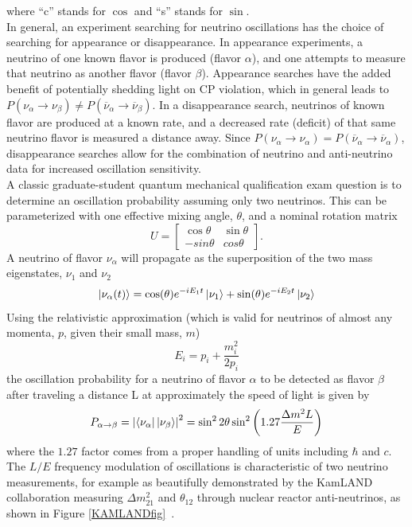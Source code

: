 where ``c'' stands for $\cos$ and ``s'' stands for $\sin$.\\

In general, an experiment searching for neutrino oscillations has the choice of searching for appearance or disappearance. In appearance experiments, a neutrino of one known flavor is produced (flavor $\alpha$), and one attempts to measure that neutrino as another flavor (flavor $\beta$). Appearance searches have the added benefit of potentially shedding light on CP violation, which in general leads to $P(\nu_\alpha\rightarrow\nu_\beta) \ne P(\overline{\nu}_\alpha\rightarrow\overline{\nu}_\beta)$. In a disappearance search, neutrinos of known flavor are produced at a known rate, and a decreased rate (deficit) of that same neutrino flavor is measured a distance away. Since $P(\nu_\alpha\rightarrow\nu_\alpha) = P(\overline{\nu}_\alpha\rightarrow\overline{\nu}_\alpha)$, disappearance searches allow for the combination of neutrino and anti-neutrino data for increased oscillation sensitivity.\\

A classic graduate-student quantum mechanical qualification exam question is to determine an oscillation probability assuming only two neutrinos. This can be parameterized with one effective mixing angle, $\theta$, and a nominal rotation matrix
\begin{equation}\label{rotmatrix}
U = \begin{bmatrix} \cos\theta & \sin\theta \\ -sin\theta & cos\theta \end{bmatrix}.
\end{equation}
A neutrino of flavor $\nu_\alpha$ will propagate as the superposition of the two mass eigenstates, $\nu_1$ and $\nu_2$
\begin{equation}\label{twonupropagation}
\Ket{\nu_\alpha (t)} = \cos(\theta)e^{-iE_1t}\ket{\nu_1} + \sin(\theta)e^{-iE_2t}\ket{\nu_2} 
\end{equation}
Using the relativistic approximation (which is valid for neutrinos of almost any momenta, $p$, given their small mass, $m$)
\begin{equation}\label{relapprox}
E_i = p_i + \frac{m_i^2}{2p_i}
\end{equation}
the oscillation probability for a neutrino of flavor $\alpha$ to be detected as flavor $\beta$ after traveling a distance L at approximately the speed of light is given by
\begin{equation}\label{twoneutrinooscprob0}
P_{\alpha \rightarrow \beta} = \left|\Bra{\nu_\alpha}\Ket{\nu_\beta}\right|^2 = \sin^2 2\theta \sin^2 \left( 1.27 \frac{\Delta m^2 L}{E} \right)
\end{equation}
where the $1.27$ factor comes from a proper handling of units including $\hbar$ and $c$. The $L/E$ frequency modulation of oscillations is characteristic of two neutrino measurements, for example as beautifully demonstrated by the KamLAND collaboration measuring $\Delta m_{21}^2$ and $\theta_{12}$ through nuclear reactor anti-neutrinos, as shown in Figure \ref{KAMLANDfig}~\cite{KAMLANDsource}.

